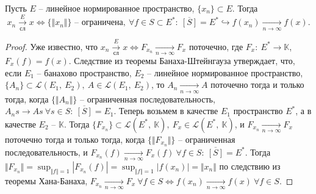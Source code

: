 \begin{theorem}
Пусть $\displaystyle E$ -- линейное нормированное пространство, $\displaystyle \{x_{n}\} \subset E$. Тогда
\begin{equation*}
x_{n}\xrightarrow[\text{сл}]{E} x\Leftrightarrow \{\Vert x_{n}\Vert \}\text{ -- ограничена} ,\ \forall f\in S\subset E^{*} :\ \overline{[ S]} =E^{*} \hookrightarrow f( x_{n})\xrightarrow[n\rightarrow \infty ]{} f( x) .
\end{equation*}
\end{theorem}
\begin{proof}
Уже известно, что $\displaystyle x_{n}\xrightarrow[\text{сл}]{E} x\Leftrightarrow F_{x_{n}}\xrightarrow[n\rightarrow \infty ]{} F_{x}$ поточечно, где $\displaystyle F_{x} :\ E^{*}\rightarrow \mathbb{K}$, $\displaystyle F_{x}( f) =f( x)$. Следствие из теоремы Банаха-Штейнгауза утверждает, что, если $\displaystyle E_{1}$ -- банахово пространство, $\displaystyle E_{2}$ -- линейное нормированное пространство, $\displaystyle \{A_{n}\} \subset \mathcal{L}( E_{1} ,\ E_{2}) ,\ A\in \mathcal{L}( E_{1} ,\ E_{2})$, то $\displaystyle A_{n}\xrightarrow[n\rightarrow \infty ]{} A$ поточечно тогда и только тогда, когда $\displaystyle \{\Vert A_{n}\Vert \}$ -- ограниченная последовательность, $\displaystyle A_{n} s\rightarrow As\ \forall s\in S:\ \overline{[ S]} =E_{1}$. Теперь возьмем в качестве $\displaystyle E_{1}$ пространство $\displaystyle E^{*}$, а в качестве $\displaystyle E_{2}$ -- $\displaystyle \mathbb{K}$. Тогда $\displaystyle \{F_{x_{n}}\} \subset \mathcal{L}\left( E^{*} ,\ \mathbb{K}\right) ,\ F_{x} \in \mathcal{L}\left( E^{*} ,\ \mathbb{K}\right)$, и $\displaystyle F_{x_{n}}\xrightarrow[n\rightarrow \infty ]{} F_{x}$ поточечно тогда и только тогда, когда $\displaystyle \{\Vert F_{x_{n}}\Vert \}$ -- ограниченная последовательность, и $\displaystyle F_{x_{n}}( f)\xrightarrow[n\rightarrow \infty ]{} F_{x}( f) \ \forall f\in S:\ \overline{[ S]} =E^{*}$. Тогда $\displaystyle \Vert F_{x_{n}}\Vert =\sup _{\Vert f\Vert =1}| F_{x_{n}}( f)| =\sup _{\Vert f\Vert =1}| f( x_{n})| =\Vert x_{n}\Vert $ по следствию из теоремы Хана-Банаха, $\displaystyle F_{x_{n}}\xrightarrow[n\rightarrow \infty ]{} F_{x} \ \forall f\in S\Leftrightarrow f( x_{n})\xrightarrow[n\rightarrow \infty ]{} f( x) \ \forall f\in S$.
\end{proof}
